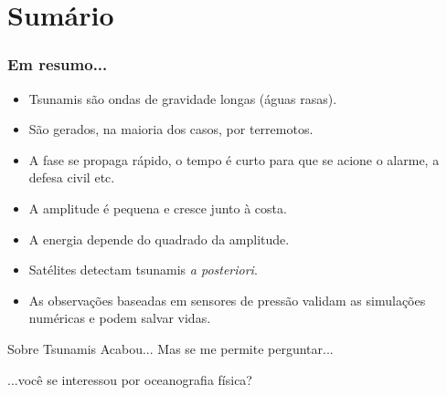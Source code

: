 \documentclass{beamer}
\begin{document}
\section{Sumário}
\begin{frame}
  \frametitle{Em resumo...}
  \begin{itemize}\setlength{\itemsep}{2ex}
  \item Tsunamis são ondas de gravidade longas (águas rasas).
  \item São gerados, na maioria dos casos, por terremotos.
  \item A fase se propaga rápido, o tempo é curto para que se acione o alarme, a defesa civil etc.
  \item A amplitude é pequena e cresce junto à costa.
  \item A energia depende do quadrado da amplitude.
  \item Satélites detectam tsunamis {\em a posteriori}.
  \item As observações baseadas em sensores de pressão validam
    as simulações numéricas e podem salvar vidas.
  \end{itemize}
\end{frame}
\begin{frame}{Sobre Tsunamis Acabou...}
\LARGE
Mas se me permite perguntar...

\vspace{4cm}

\Large
\hfill...você se interessou por oceanografia física?
\normalsize
\end{frame}
\end{document}
